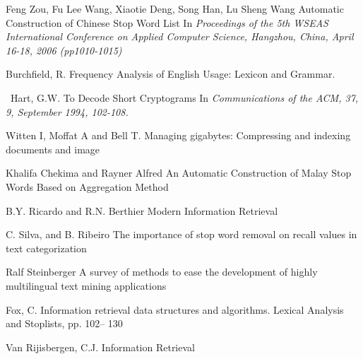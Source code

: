 \documentclass{article}
\begin{document}
\begin{thebibliography}{1}
Feng Zou, Fu Lee Wang, Xiaotie Deng, Song Han, Lu Sheng Wang
\newblock Automatic Construction of Chinese Stop Word List
\newblock In {\em Proceedings of the 5th WSEAS International Conference on Applied Computer Science, Hangzhou, China, April 16-18, 2006 (pp1010-1015)}

Burchfield, R. 
\newblock Frequency Analysis of English Usage: Lexicon and Grammar.

\ Hart, G.W.
\newblock To Decode Short Cryptograms
\newblock In {\em Communications of the ACM, 37, 9, September 1994, 102-108.}

Witten I, Moffat A and Bell T.
\newblock Managing gigabytes: Compressing and indexing documents and image

Khalifa Chekima and Rayner Alfred
\newblock An Automatic Construction of Malay Stop Words Based on Aggregation Method

B.Y. Ricardo and R.N. Berthier
\newblock Modern Information Retrieval

C. Silva, and B. Ribeiro
\newblock The importance of stop word removal on recall values in text categorization

Ralf Steinberger
\newblock A survey of methods to ease the development of highly
multilingual text mining applications

Fox, C.
\newblock Information retrieval data structures and algorithms. Lexical Analysis and Stoplists, pp. 102– 130

Van Rijisbergen, C.J.
\newblock Information Retrieval

\end{thebibliography}
\end{document}
